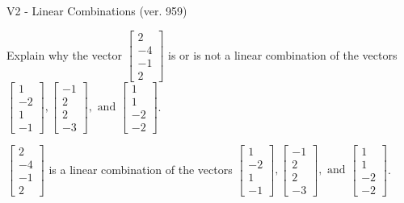 \begin{exercise}
  \begin{exerciseTitle}V2 - Linear Combinations (ver. 959)\end{exerciseTitle}
  \begin{exerciseStatement}
    Explain why the vector \(\left[\begin{array}{c}
2 \\
-4 \\
-1 \\
2
\end{array}\right]\)  is or is not a linear 
	combination of the vectors \(\left[\begin{array}{c}
1 \\
-2 \\
1 \\
-1
\end{array}\right] , \left[\begin{array}{c}
-1 \\
2 \\
2 \\
-3
\end{array}\right] , \text{ and } \left[\begin{array}{c}
1 \\
1 \\
-2 \\
-2
\end{array}\right]\).
	


  \end{exerciseStatement}
  \begin{exerciseAnswer}
   \(\left[\begin{array}{c}
2 \\
-4 \\
-1 \\
2
\end{array}\right]\) 
  	 is  
	a linear combination of the vectors \(\left[\begin{array}{c}
1 \\
-2 \\
1 \\
-1
\end{array}\right] , \left[\begin{array}{c}
-1 \\
2 \\
2 \\
-3
\end{array}\right] , \text{ and } \left[\begin{array}{c}
1 \\
1 \\
-2 \\
-2
\end{array}\right]\).

	
  


  \end{exerciseAnswer}
\end{exercise}